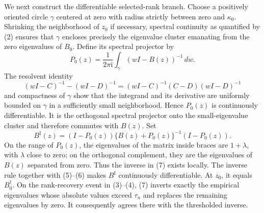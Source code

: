 We next construct the differentiable selected-rank branch.  Choose a positively oriented circle \(\gamma\) centered at zero with radius strictly between zero and \(\kappa_0\).  Shrinking the neighborhood of \(z_0\) if necessary, spectral continuity as quantified by (2) ensures that \(\gamma\) encloses precisely the eigenvalue cluster emanating from the zero eigenvalues of \(B_0\).  Define its spectral projector by
\[
 P_0(z)=\frac{1}{2\pi\mathrm i}
 \int_\gamma (wI-B(z))^{-1}\,dw.
 \tag{5}
\]
The resolvent identity
\[
 (wI-C)^{-1}-(wI-D)^{-1}
 =(wI-C)^{-1}(C-D)(wI-D)^{-1}
 \tag{6}
\]
and compactness of \(\gamma\) show that the integrand and its derivative are uniformly bounded on \(\gamma\) in a sufficiently small neighborhood.  Hence \(P_0(z)\) is continuously differentiable.  It is the orthogonal spectral projector onto the small-eigenvalue cluster and therefore commutes with \(B(z)\).  Set
\[
 B^{\sharp}(z)
 =(I-P_0(z))\{B(z)+P_0(z)\}^{-1}(I-P_0(z)).
 \tag{7}
\]
On the range of \(P_0(z)\), the eigenvalues of the matrix inside braces are \(1+\lambda\), with \(\lambda\) close to zero; on the orthogonal complement, they are the eigenvalues of \(B(z)\) separated from zero.  Thus the inverse in (7) exists locally.  The inverse rule together with (5)--(6) makes \(B^{\sharp}\) continuously differentiable.  At \(z_0\), it equals \(B_0^\dagger\).  On the rank-recovery event in (3)--(4), (7) inverts exactly the empirical eigenvalues whose absolute values exceed \(\tau_n\) and replaces the remaining eigenvalues by zero.  It consequently agrees there with the thresholded inverse.

